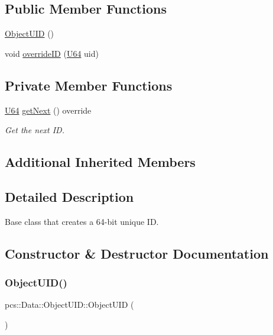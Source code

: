 \subsection*{Public Member Functions}
\begin{DoxyCompactItemize}
\item 
\hyperlink{classpcs_1_1Data_1_1ObjectUID_a04780c31ec526182ea5abf7351e84459}{Object\+U\+ID} ()
\item 
void \hyperlink{classpcs_1_1Data_1_1ObjectUID_a8ceb01cdc531488d8033f7eeb07cb796}{override\+ID} (\hyperlink{namespacepcs_1_1Data_a9aad6b21cf2fcd3515ecc3bbd069eb34}{U64} uid)
\end{DoxyCompactItemize}
\subsection*{Private Member Functions}
\begin{DoxyCompactItemize}
\item 
\hyperlink{namespacepcs_1_1Data_a9aad6b21cf2fcd3515ecc3bbd069eb34}{U64} \hyperlink{classpcs_1_1Data_1_1ObjectUID_a1a1cc75b0ed7e6c04f2f5daa33e0193e}{get\+Next} () override
\begin{DoxyCompactList}\small\item\em Get the next ID. \end{DoxyCompactList}\end{DoxyCompactItemize}
\subsection*{Additional Inherited Members}


\subsection{Detailed Description}
Base class that creates a 64-\/bit unique ID. 

\subsection{Constructor \& Destructor Documentation}
\mbox{\label{classpcs_1_1Data_1_1ObjectUID_a04780c31ec526182ea5abf7351e84459}} 
\subsubsection{\texorpdfstring{Object\+U\+I\+D()}{ObjectUID()}}
{\footnotesize\ttfamily pcs\+::\+Data\+::\+Object\+U\+I\+D\+::\+Object\+U\+ID (\begin{DoxyParamCaption}{ }\end{DoxyParamCaption})\hspace{0.3cm}{\ttfamily [inline]}}



